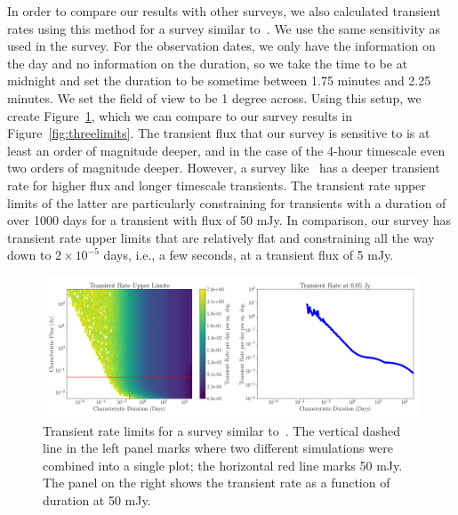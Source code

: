 \documentclass[12pt]{article}
\begin{document}
In order to compare our results with other surveys, we also calculated transient rates using this method for a survey similar to~\citet{2011ApJ...728L..14B}. We use the same sensitivity as used in the survey. For the observation dates, we only have the information on the day and no information on the duration, so we take the time to be at midnight and set the duration to be sometime between 1.75 minutes and 2.25 minutes. We set the field of view to be 1 degree across. Using this setup, we create Figure~\ref{fig:bowerandsaulall}, which we can compare to our survey results in Figure~\ref{fig:threelimits}. The transient flux that our survey is sensitive to is at least an order of magnitude deeper, and in the case of the 4-hour timescale even two orders of magnitude deeper. However, a survey like~\citet{2011ApJ...728L..14B} has a deeper transient rate for higher flux and longer timescale transients. The transient rate upper limits of the latter are particularly constraining for transients with a duration of over 1000 days for a transient with flux of 50 mJy. In comparison, our survey has transient rate upper limits that are relatively flat and constraining all the way down to $2\times10^{-5}$ days, i.e., a few seconds, at a transient flux of 5 mJy. 


\begin{figure}
	\includegraphics[width=\textwidth]{bowerandsauletal.png}
	\caption{Transient rate limits for a survey similar to~\citet{2011ApJ...728L..14B}. The vertical dashed line in the left panel marks where two different simulations were combined into a single plot; the horizontal red line marks 50 mJy. The panel on the right shows the transient rate as a function of duration at 50 mJy.}
	\label{fig:bowerandsaulall}
\end{figure}
\end{document}
